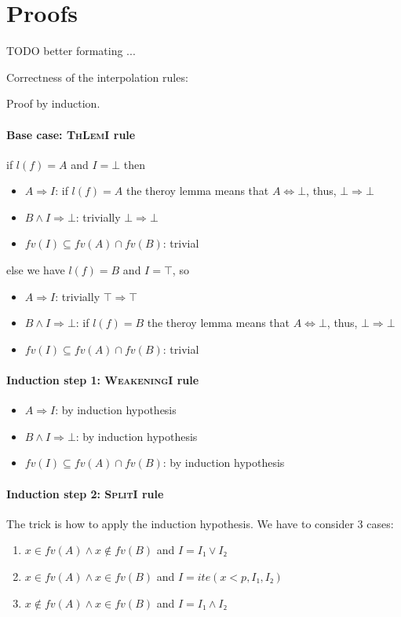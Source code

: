 \section{Proofs}

TODO better formating ...

Correctness of the interpolation rules:

Proof by induction.

\paragraph{Base case: \textsc{ThLemI} rule}
if $l(f)=A$ and $I=⊥$ then
\begin{itemize}
\item $A ⇒ I$: if $l(f)=A$ the theroy lemma means that $A⇔⊥$, thus, $⊥⇒⊥$
\item $B ∧ I ⇒ ⊥$: trivially $⊥⇒⊥$
\item $fv(I) ⊆ fv(A) ∩ fv(B)$: trivial
\end{itemize}

else we have $l(f)=B$ and $I=\top$, so
\begin{itemize}
\item $A ⇒ I$: trivially $\top ⇒ \top$
\item $B ∧ I ⇒ ⊥$:  if $l(f)=B$ the theroy lemma means that $A⇔⊥$, thus, $⊥⇒⊥$
\item $fv(I) ⊆ fv(A) ∩ fv(B)$: trivial
\end{itemize}

\paragraph{Induction step 1: \textsc{WeakeningI} rule}
\begin{itemize}
\item $A ⇒ I$: by induction hypothesis
\item $B ∧ I ⇒ ⊥$: by induction hypothesis
\item $fv(I) ⊆ fv(A) ∩ fv(B)$: by induction hypothesis
\end{itemize}

\paragraph{Induction step 2: \textsc{SplitI} rule}
The trick is how to apply the induction hypothesis.
We have to consider 3 cases:
\begin{enumerate}
\item $x ∈ fv(A) ∧ x \notin fv(B)$ and $I = I₁ ∨ I₂$
\item $x ∈ fv(A) ∧ x ∈ fv(B)$ and $I = ite(x < p, I₁, I₂)$
\item $x \notin fv(A) ∧ x ∈ fv(B)$ and $I = I₁ ∧ I₂$
\end{enumerate}

